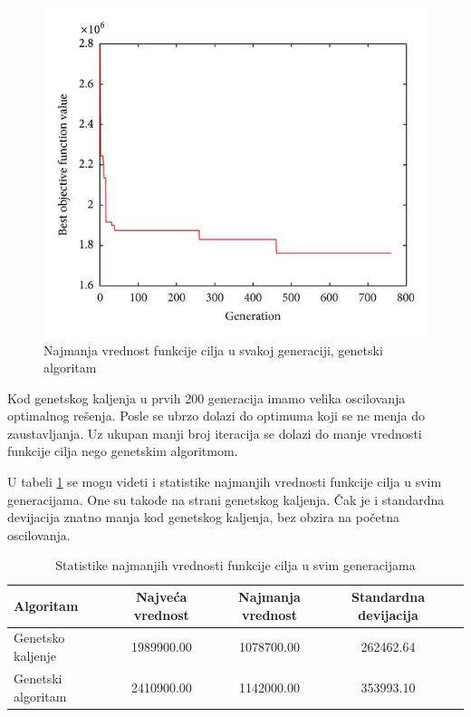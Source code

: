 \documentclass[a4paper]{article}
\begin{document}
\newpage
\begin{figure}[h!]
\centering
\includegraphics[scale= 0.4]{LIRP_Grafik_Genetski_Algoritam}
\caption{Najmanja vrednost funkcije cilja u svakoj generaciji, genetski algoritam}

\label{fig:4}
\end{figure}

Kod genetskog kaljenja u prvih 200 generacija imamo velika oscilovanja optimalnog rešenja. Posle se ubrzo dolazi do optimuma koji se ne menja do zaustavljanja. Uz ukupan manji broj iteracija se dolazi do manje vrednosti funkcije cilja nego genetskim algoritmom.

U tabeli \ref{tab:tabela2} se mogu videti i statistike najmanjih vrednosti funkcije cilja u svim generacijama. One su takođe na strani genetskog kaljenja. Čak je i standardna devijacija znatno manja kod genetskog kaljenja, bez obzira na početna oscilovanja.

\begin{table}[ht]
\begin{center}
\centering
\begin{tabular}{|l|c|c|c|c|} \hline
     Algoritam & Najveća vrednost & Najmanja vrednost  & Standardna devijacija \\ \hline
     Genetsko kaljenje &  1989900.00 & 1078700.00 	& 262462.64 \\ \hline
     Genetski algoritam & 2410900.00 & 1142000.00  & 353993.10 \\ \hline
\end{tabular}
\end{center}
\label{tab:tabela2}
\caption{Statistike najmanjih vrednosti funkcije cilja u svim generacijama}
\end{table}
\end{document}
